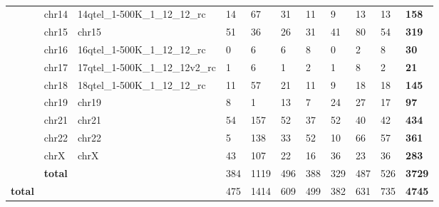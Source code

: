 \begin{samepage}
\begin{table}[h!]
\begin{tabular}{lllllllllll}
\textbf{}      & chr14               & 14qtel\_1-500K\_1\_12\_12\_rc   & 14             & 67             & 31             & 11             & 9              & 13             & 13             & \textbf{158}   \\
\textbf{}      & chr15               & chr15                           & 51             & 36             & 26             & 31             & 41             & 80             & 54             & \textbf{319}   \\
\textbf{}      & chr16               & 16qtel\_1-500K\_1\_12\_12\_rc   & 0              & 6              & 6              & 8              & 0              & 2              & 8              & \textbf{30}    \\
\textbf{}      & chr17               & 17qtel\_1-500K\_1\_12\_12v2\_rc & 1              & 6              & 1              & 2              & 1              & 8              & 2              & \textbf{21}    \\
\textbf{}      & chr18               & 18qtel\_1-500K\_1\_12\_12\_rc   & 11             & 57             & 21             & 11             & 9              & 18             & 18             & \textbf{145}   \\
\textbf{}      & chr19               & chr19                           & 8              & 1              & 13             & 7              & 24             & 27             & 17             & \textbf{97}    \\
\textbf{}      & chr21               & chr21                           & 54             & 157            & 52             & 37             & 52             & 40             & 42             & \textbf{434}   \\
\textbf{}      & chr22               & chr22                           & 5              & 138            & 33             & 52             & 10             & 66             & 57             & \textbf{361}   \\
\textbf{}      & chrX                & chrX                            & 43             & 107            & 22             & 16             & 36             & 23             & 36             & \textbf{283}   \\
\textbf{}      & \textbf{total}      & \textbf{}                       & 384            & 1119           & 496            & 388            & 329            & 487            & 526            & \textbf{3729}  \\
\textbf{total} & \textbf{}           & \textbf{}                       & 475            & 1414           & 609            & 499            & 382            & 631            & 735            & \textbf{4745}  \\
\hline
\end{tabular}
\caption{}
\label{}
\end{table}
\end{samepage}
